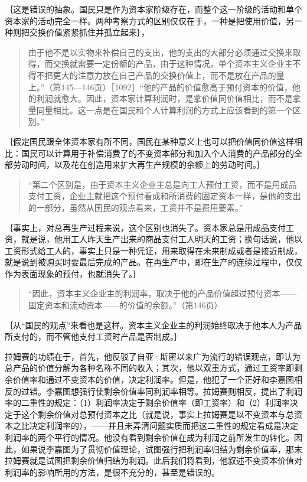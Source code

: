 ｛这是错误的抽象。国民只是作为资本家阶级存在，而整个这一阶级的活动和单个资本家的活动完全一样。两种考察方式的区别仅仅在于，一种是把使用价值，另一种则把交换价值紧紧抓住并孤立起来｝，

\begin{quote}{由于他不是以实物来补偿自己的支出，他的支出的大部分必须通过交换来取得，而交换就需要一定份额的产品，由于这种情况，单个资本主义企业主不得不把更大的注意力放在自己产品的交换价值上，而不是放在产品的量上。”（第145—146页）［1092］“他的产品的价值愈高于预付资本的价值，他的利润就愈大。因此，资本家计算利润时，是拿价值同价值相比，而不是拿量同量相比。这一点是在国民和个人计算利润的方式上应该看到的第一个区别。”}\end{quote}

｛假定国民跟全体资本家有所不同，国民在某种意义上也可以把价值同价值这样相比：国民可以计算用于补偿消费了的不变资本部分和加入个人消费的产品部分的全部劳动时间，以及花在创造用来扩大再生产规模的余额上的劳动时间。｝

\begin{quote}{“第二个区别是，由于资本主义企业主总是向工人预付工资，而不是用成品支付工资，企业主就把这个预付看成和所消费的固定资本一样，是他的支出的一部分，虽然从国民的观点看来，工资并不是费用要素。”}\end{quote}

｛事实上，对总再生产过程来说，这个区别也消失了。资本家总是用成品支付工资，就是说，他用工人昨天生产出来的商品支付工人明天的工资；换句话说，他以工资形式给工人的，事实上只是一种凭证，用来取得在未来制成或者是接近制成，就是说到被购买时要最后完成的产品。在再生产中，即在生产的连续过程中，仅仅作为表面现象的预付，也就消失了。｝

\begin{quote}{“因此，资本主义企业主的利润率，取决于他的产品价值超过预付资本——固定资本和流动资本——的价值的余额。”（第146页）}\end{quote}

｛从“国民的观点”来看也是这样。资本主义企业主的利润始终取决于他本人为产品所支付的，而不管他支付工资时产品是否制成。｝

拉姆赛的功绩在于，首先，他反驳了自亚·斯密以来广为流行的错误观点，即认为总产品的价值分解为各种名称不同的收入；其次，他以双重方式，通过工资率即剩余价值率和通过不变资本的价值，决定利润率。但是，他犯了一个正好和李嘉图相反的过错。李嘉图想强行使剩余价值率同利润率相等。拉姆赛则相反，提出了利润率的二重性的规定：（1）利润率决定于剩余价值率（即工资率）和（2）利润率决定于这个剩余价值对总预付资本之比（就是说，事实上拉姆赛是以不变资本与总资本之比决定利润率的），——并且未弄清问题实质而把这二重性的规定看成是决定利润率的两个平行的情况。他没有看到剩余价值在成为利润之前所发生的转化。因此，如果说李嘉图为了贯彻价值理论，试图强行把利润率归结为剩余价值率，那末拉姆赛就是试图把剩余价值归结为利润。此后我们将看到，他叙述不变资本价值对利润率的影响所用的方法，是很不充分的，甚至是错误的。

